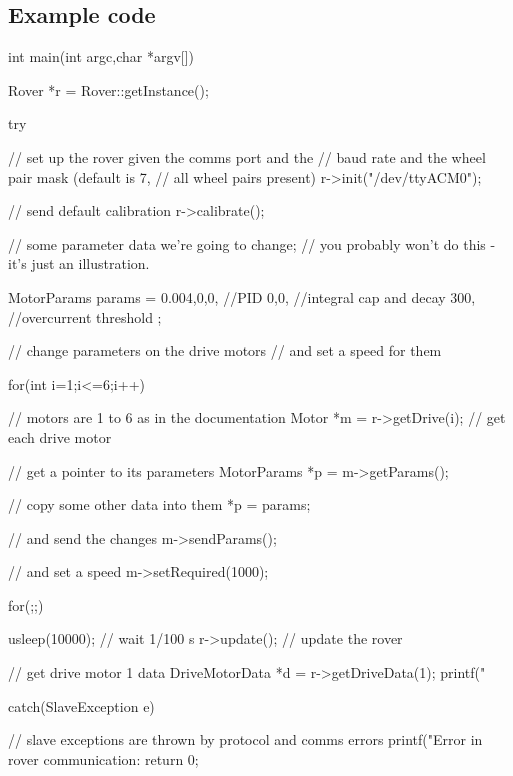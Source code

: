 \subsection{Example code}
\begin{v}
int main(int argc,char *argv[]){
    Rover *r = Rover::getInstance();
    
    try {
        // set up the rover given the comms port and the
        // baud rate and the wheel pair mask (default is 7,
        // all wheel pairs present)
        r->init("/dev/ttyACM0");
        
        // send default calibration
        r->calibrate();
        
        // some parameter data we're going to change;
        // you probably won't do this - it's just an illustration.

        MotorParams params = {
            0.004,0,0,   //PID
            0,0,         //integral cap and decay
            300,         //overcurrent threshold
        };
        
        // change parameters on the drive motors
        // and set a speed for them
        
        for(int i=1;i<=6;i++) { // motors are 1 to 6 as in the documentation
            Motor *m = r->getDrive(i); // get each drive motor

            // get a pointer to its parameters
            MotorParams *p = m->getParams();

            // copy some other data into them
            *p = params;

            // and send the changes
            m->sendParams();

            // and set a speed
            m->setRequired(1000);
        }
        
        for(;;){
            usleep(10000); // wait 1/100 s
            r->update(); // update the rover

            // get drive motor 1 data
            DriveMotorData *d = r->getDriveData(1);
            printf("%
        }   
        
    } catch(SlaveException e) {

        // slave exceptions are thrown by protocol and comms errors
        printf("Error in rover communication: %
        return 0;
    }
}        
    

\end{v}


